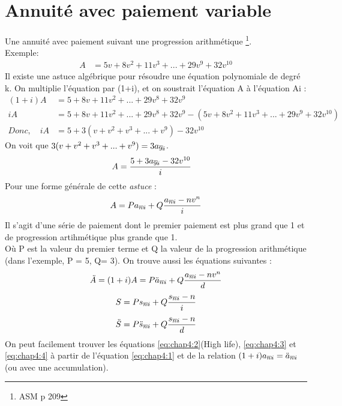 \documentclass[11pt,french]{report}
\makeatletter
\DeclareRobustCommand{\annuity}[1]{%
\def\arraystretch{0}%
\setlength\arraycolsep{.7pt}%
\setlength\arrayrulewidth{.3pt}%
\begin{array}[b]{@{}c|}\hline
\\[\arraycolsep]%
\scriptstyle #1%
\end{array}%
}
\makeatother
\begin{document}
\section{Annuité avec paiement variable}
\label{sec:Annuité paiement variable}

Une annuité avec paiement suivant une progression arithmétique \footnote{ASM p 209}. 
\\Exemple:
\begin{align*}
A & = 5v + 8v^2 + 11v^3 + ... + 29 v^9 + 32v^{10}
\end{align*}
Il existe une astuce algébrique pour résoudre une équation polynomiale de degré k. On multiplie l'équation par (1+i), et on soustrait l'équation A à l'équation Ai :
\begin{align*}
(1+i)A & = 5 + 8v + 11v^2 + ... + 29 v^8 + 32v^9 \\
iA & = 5 + 8v + 11v^2 + ... + 29 v^8 + 32v^9 - (5v + 8v^2 + 11v^3 + ... + 29 v^9 + 32v^{10}) \\
Donc, \quad iA & = 5 + 3(v +v^2 + v^3 + ...+v^9) - 32v^{10}
\end{align*}
On voit que $ 3(v +v^2 + v^3 + ...+v^9) = 3a_{\annuity{9}i} $.
\begin{align*}
A & = \frac{5 + 3a_{\annuity{9}i} -32v^{10}}{i}
\end{align*}
Pour une forme générale de cette \emph{astuce} :
\begin{equation}
\label{eq:chap4:1}
A = Pa_{\annuity{n}i} + Q \frac{a_{\annuity{n}i} - nv^{n}}{i} 
\end{equation}
Il s'agit d'une série de paiement dont le premier paiement est plus grand que 1 et de progression artihmétique plus grande que 1.
\\Où P est la valeur du premier terme et Q la valeur de la progression arithmétique (dans l'exemple, P = 5, Q= 3). On trouve aussi les équations suivantes :
\begin{equation}
\label{eq:chap4:2}
\ddot{A} = (1+i)A = P\ddot{a}_{\annuity{n}i} + Q \frac{a_{\annuity{n}i} - nv^{n}}{d}
\end{equation}
\begin{equation}
\label{eq:chap4:3}
S = Ps_{\annuity{n}i} + Q \frac{s_{\annuity{n}i} - n}{i}
\end{equation}
\begin{equation}
\label{eq:chap4:4}
\ddot{S} = P\ddot{s}_{\annuity{n}i} + Q \frac{s_{\annuity{n}i} - n}{d}
\end{equation}
On peut facilement trouver les équations \ref{eq:chap4:2}(High life), \ref{eq:chap4:3} et \ref{eq:chap4:4} à partir de l'équation \ref{eq:chap4:1} et de la relation $ (1+i)a_{\annuity{n}i} = \ddot{a}_{\annuity{n}i} $ (ou avec une accumulation).
\end{document}
